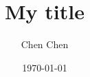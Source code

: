 

%
%
%
%
%
%
%
%

\documentclass[a4paper]{article}

\title{My title}
\author{Chen Chen}
\date{\today}
\maketitle

\begin{abstract}
This is my abstracts.
\end{abstract}

\chapter{The Document}

\section{Section}
My first section.
\subsection{subsection}
my subsection

my car is good


